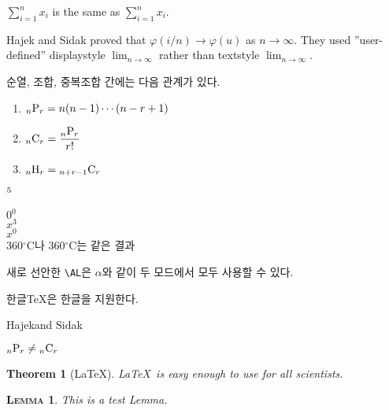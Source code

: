 \documentclass[11pt]{article}
\newcommand{\dsum}[2]{\displaystyle \sum_{#1}^{#2}}
\newcommand{\vphi}{\varphi}
\newcommand{\go}{\longrightarrow}
\newcommand{\Hajek}{Hajek}
\newcommand{\Sidak}{Sidak}
\newcommand{\dlim}[1]{{\displaystyle \lim_{#1}}}
\newcommand{\harcombi}[2]{{}_{#1}{\rm H}_{#2}}
\newcommand{\permut}[2]{{}_{#1}{\rm P}_{#2}}
\newcommand{\combi}[2]{{}_{#1}{\rm C}_{#2}}
\newcommand{\tmp}[1][0]{$\mathrm{R}^{#1}$}
\renewcommand{\tmp}[2][0]{$#2^#1$}
\providecommand{\mdegree}[1]{#1\ensuremath{^\circ}}
\newcommand{\AL}{\ensuremath{\alpha}}
\newcommand{\htex}{\mbox{한글\TeX}}
\newcommand{\HandS}{\Hajek and \Sidak}
\newcommand{\pandc}[2]{\permut{#1}{#2} \ne \combi{#1}{#2}}
\newtheorem{theorem}{Theorem}[section]
\newtheorem{la}{\scshape Lemma}[section]
\begin{document}
$\dsum{i=1}{n} x_i$ is the same as $\sum_{i=1}^n x_i$.

Hajek and Sidak proved that $\vphi (i/n)\go \vphi(u)$ as $n\go\infty$. They used  ''user-defined'' displaystyle $\dlim{n\go\infty}$ rather than textstyle $\lim_{n\go\infty}$.

순열, 조합, 중복조합 간에는 다음 관계가 있다.
\begin{enumerate}
\item $\permut{n}{r}=n(n-1)\cdots(n-r+1)$
\item $\combi{n}{r}={\displaystyle \frac{\permut{n}{r}}{r!}}$
\item $\harcombi{n}{r}=\combi{n+r-1}{r}$
\end{enumerate}

\tmp[5] \\

\tmp{0} \\

\tmp[3]{x} \\

\tmp{x}  \\

\mdegree{360}C나 $\mdegree{360}$C는 같은 결과

새로 선안한 \verb+\AL+은  $\AL$와 같이 두 모드에서 모두 사용할 수 있다.

\htex 은 한글을 지원한다.

\HandS

$\pandc{n}{r}$

\begin{theorem}[\LaTeX] \label{th:texusage}
\LaTeX\ is easy enough to use for all scientists.
\end{theorem}

\begin{la}
This is a test Lemma.
\end{la}
\end{document}
